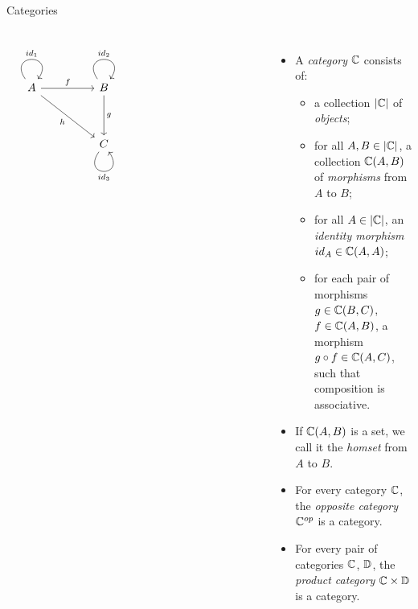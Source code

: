 \begin{frame}[fragile]{Categories}
\begin{columns}
\[\begin{tikzcd}
	A && B \\
	\\
	&& C &&&&& {}
	\arrow["{id_1}", from=1-1, to=1-1, loop, in=55, out=125, distance=10mm]
	\arrow["f", from=1-1, to=1-3]
	\arrow["{h}"', from=1-1, to=3-3]
	\arrow["{id_2}", from=1-3, to=1-3, loop, in=55, out=125, distance=10mm]
	\arrow["g", from=1-3, to=3-3]
	\arrow["{id_3}"', from=3-3, to=3-3, loop, in=305, out=235, distance=10mm]
\end{tikzcd}\]
\begin{itemize}
 \item
A \textit{category} $\mathbb{C}$ consists of:
\begin{itemize}
 \pause\item a collection $|\mathbb{C}|$ of \textit{objects};
 \pause\item for all $A, B \in |\mathbb{C}|$, a collection $\mathbb{C}(A, B)$ of \textit{morphisms} from $A$ to $B$;
 \pause\item for all $A \in |\mathbb{C}|$, an \textit{identity morphism} $id_A \in \mathbb{C}(A, A)$;
 \pause\item for each pair of morphisms $g \in \mathbb{C}(B,C)$, $f \in \mathbb{C}(A,B)$, a morphism $g \circ f \in \mathbb{C}(A,C)$, such that composition is associative.
\end{itemize}
\pause\item If $\mathbb{C}(A, B)$ is a set, we call it the \textit{homset} from $A$ to $B$.
\pause\item For every category $\mathbb{C}$, the \textit{opposite category} $\mathbb{C}^{op}$ is a category.
\pause\item For every pair of categories $\mathbb{C}$, $\mathbb{D}$, the \textit{product category} $\mathbb{C} \times \mathbb{D}$ is a category.
\end{itemize}
\end{columns}
\end{frame}
